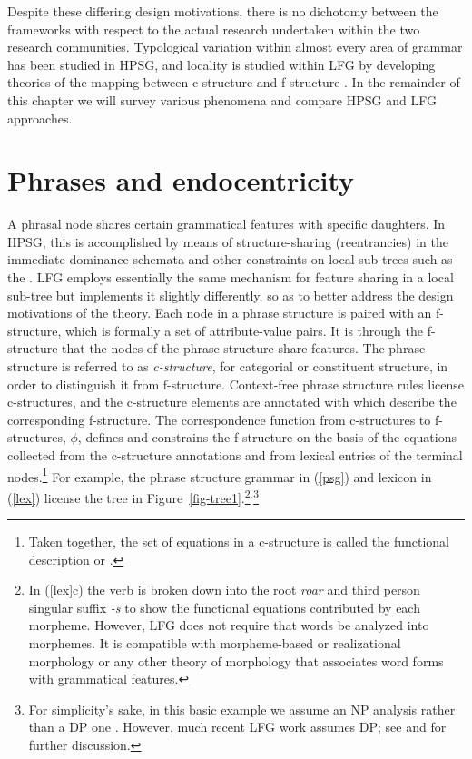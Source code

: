Despite these differing design motivations, there is no dichotomy between the frameworks with respect to the actual research undertaken within the two research communities.  Typological variation within almost every area of grammar has been studied in HPSG, and locality is studied within LFG by developing theories of the mapping between c-structure and f-structure  \citep[see][88--128]{BATW2016a}.   In the remainder of this chapter we will survey various phenomena and compare HPSG and LFG approaches.


\section{Phrases and endocentricity} 
A phrasal node shares certain grammatical features with specific daughters. %
In HPSG, this is accomplished
by means of structure-sharing (reentrancies) in the immediate dominance schemata and other 
constraints on local sub-trees such as the .  LFG employs essentially the same mechanism for feature sharing in a local sub-tree but implements it slightly differently, so as to better address the design motivations of the theory.  Each node in a phrase structure is paired with an f-structure, which is formally a set of attribute-value pairs.  It is through the f-structure that the nodes of the phrase structure share features.   The phrase structure is referred to as \textit{c-structure}, for categorial or constituent structure, in order to distinguish it from f-structure. 
Context-free phrase structure rules  license c-structures, and the c-structure elements are annotated with  which describe the corresponding f-structure.  
The correspondence function from c-structures to f-structures, $\phi$, defines and constrains the f-structure on the basis of the  equations collected from the c-structure annotations and from lexical entries of the terminal nodes.\footnote{Taken together, the set of equations in a c-structure is called the functional description or .}  For example, the phrase structure grammar in (\ref{psg}) and lexicon in (\ref{lex}) license the tree in Figure~\ref{fig-tree1}.\footnote{In (\ref{lex}c) the verb is broken down into the root \textit{roar} and third person singular suffix \textit{-s} to show the functional equations contributed by each morpheme.  However, LFG does not require that words be analyzed into morphemes.  It is compatible with morpheme-based \citep[e.g.,][384--385, 395--396]{ishikawa85,BATW2016a} or realizational morphology   \citep[Chapter 12]{dalrymple;ea19} or any other theory of morphology that associates word forms with grammatical features.}$^,$\footnote{For simplicity's sake, in this basic example we assume an NP analysis rather than a DP one \citep{Brame82a}. However, much recent LFG work assumes DP; see \citet{BATW2016a} and \citet{dalrymple;ea19} for further discussion.}

